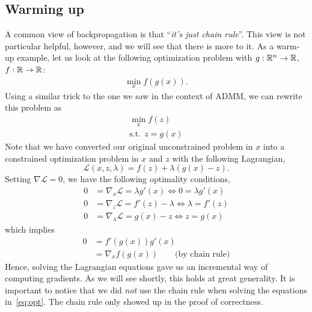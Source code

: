 \subsection{Warming up}
A common view of backpropagation is that ``\textit{it's just chain rule}''. 
This view is not particular helpful, however, and we will see that there is more
to it. As a warm-up example, let us look at the following optimization problem
with $g: \mathbb{R}^n \rightarrow \mathbb{R}$, $f: \mathbb{R} \rightarrow \mathbb{R}$:
\begin{align}
\min_{x} f(g(x)).
\end{align}
Using a similar trick to the one we saw in the context of ADMM, we can rewrite this problem as
\begin{align}
\min_{x} f(z) \\
\text{s.t.} \ \ z = g(x) \nonumber 
\end{align}
Note that we have converted our original unconstrained problem in $x$ into a constrained optimization problem in $x$ and $z$ with the following Lagrangian,
\begin{equation}
\mathcal{L} (x, z, \lambda) = f(z) + \lambda(g(x) - z).
\end{equation}
Setting $\nabla \mathcal{L} = 0$,  we have the following optimality conditions,
\begin{subequations}
\label{eq:opt}
\begin{align}
0 &= \nabla_x \mathcal{L} = \lambda g'(x) \Leftrightarrow 0 = \lambda g'(x) \label{eq:optx} \\
0 &= \nabla_z \mathcal{L} = f'(z) - \lambda \Leftrightarrow \lambda = f'(z) \label{eq:optz} \\
0 &= \nabla_{\lambda} \mathcal{L} = g(x) - z \Leftrightarrow z = g(x) \label{eq:optlambda}
\end{align}
\end{subequations}
which implies 
\begin{align}
0 &= f'(g(x))g'(x) \nonumber \\
&= \nabla_x f(g(x)) \nonumber \qquad \text{(by chain rule)} 
\end{align}
Hence, solving the Lagrangian equations gave us an incremental way of computing
gradients. As we will see shortly, this holds at great generality. It is
important to notice that we did \textit{not} use the chain rule when solving the
equations in~\eqref{eq:opt}. The chain rule only showed up in the proof of
correctness.

